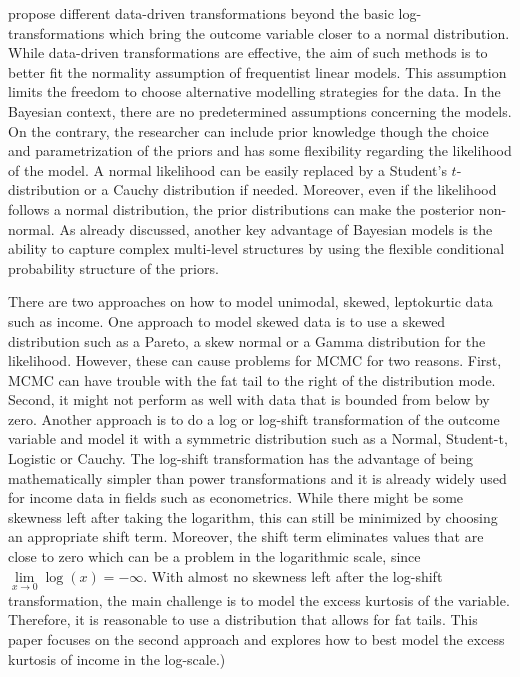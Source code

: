 \cite{rojas_perilla_data_2020} propose different data-driven transformations beyond the basic log-transformations which bring the outcome variable closer to a normal distribution. While data-driven transformations are effective, the aim of such methods is to better fit the normality assumption of frequentist linear models. This assumption limits the freedom to choose alternative modelling strategies for the data. In the Bayesian context, there are no predetermined assumptions concerning the models. On the contrary, the researcher can include prior knowledge though the choice and parametrization of the priors and has some flexibility regarding the likelihood of the model. A normal likelihood can be easily replaced by a Student's $t$-distribution or a Cauchy distribution if needed. Moreover, even if the likelihood follows a normal distribution, the prior distributions can make the posterior non-normal. As already discussed, another key advantage of Bayesian models is the ability to capture complex multi-level structures by using the flexible conditional probability structure of the priors.

There are two approaches on how to model unimodal, skewed, leptokurtic data such as income. One approach to model skewed data is to use a skewed distribution such as a Pareto, a skew normal or a Gamma distribution for the likelihood. However, these can cause problems for MCMC for two reasons. First, MCMC can have trouble with the fat tail to the right of the distribution mode. Second, it might not perform as well with data that is bounded from below by zero. Another approach is to do a log or log-shift transformation of the outcome variable and model it with a symmetric distribution such as a Normal, Student-t, Logistic or Cauchy.
The log-shift transformation has the advantage of being mathematically simpler than power transformations and it is already widely used for income data in fields such as econometrics. While there might be some skewness left after taking the logarithm, this can still be minimized by choosing an appropriate shift term. Moreover, the shift term eliminates values that are close to zero which can be a problem in the logarithmic scale, since $\underset{x \rightarrow 0}\lim \log(x) = -\infty$. With almost no skewness left after the log-shift transformation, the main challenge is to model the excess kurtosis of the variable. Therefore, it is reasonable to use a distribution that allows for fat tails. This paper focuses on the second approach and explores how to best model the excess kurtosis of income in the log-scale.)



